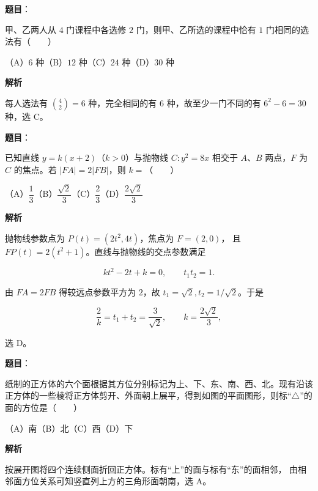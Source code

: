 \begin{answer}

\textbf{题目}：

甲、乙两人从 $4$ 门课程中各选修 $2$ 门，则甲、乙所选的课程中恰有 $1$ 门相同的选法有\mbox{（　　）}

（A）$6$ 种\quad（B）$12$ 种\quad（C）$24$ 种\quad（D）$30$ 种

\textbf{解析}

每人选法有 $\binom42=6$ 种，完全相同的有 $6$ 种，故至少一门不同的有
$6^2-6=30$ 种，选 C。


\end{answer}
\begin{answer}

\textbf{题目}：

已知直线 $y=k(x+2)$（$k>0$）与抛物线 $C:y^2=8x$ 相交于 $A\text{、}B$ 两点，$F$ 为 $C$ 的焦点。若 $|FA|=2|FB|$，则 $k=$\mbox{（　　）}

（A）$\dfrac13$\quad（B）$\dfrac{\sqrt2}{3}$\quad（C）$\dfrac23$\quad（D）$\dfrac{2\sqrt2}{3}$

\textbf{解析}

抛物线参数点为 $P(t)=(2t^2,4t)$，焦点为 $F=(2,0)$，
且 $FP(t)=2(t^2+1)$。直线与抛物线的交点参数满足

\nopagebreak[4]
\[
kt^2-2t+k=0,\qquad t_1t_2=1.
\]

由 $FA=2FB$ 得较远点参数平方为 $2$，故
$t_1=\sqrt2,t_2=1/\sqrt2$。于是

\nopagebreak[4]
\[
\frac2k=t_1+t_2=\frac3{\sqrt2},
\qquad k=\frac{2\sqrt2}{3},
\]

选 D。


\end{answer}
\begin{answer}

\textbf{题目}：

纸制的正方体的六个面根据其方位分别标记为上、下、东、南、西、北。现有沿该正方体的一些棱将正方体剪开、外面朝上展平，得到如图的平面图形，则标“$\triangle$”的面的方位是\mbox{（　　）}
\nopagebreak[4]
\begin{center}\end{center}
\nopagebreak[4]
（A）南\quad（B）北\quad（C）西\quad（D）下

\textbf{解析}

按展开图将四个连续侧面折回正方体。标有“上”的面与标有“东”的面相邻，
由相邻面方位关系可知竖直列上方的三角形面朝南，选 A。


\end{answer}
